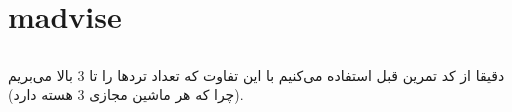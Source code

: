 \section{madvise}
\subsection{}
دقیقا از کد تمرین قبل استفاده می‌کنیم با این تفاوت که تعداد ترد‌ها را تا 3 بالا می‌بریم
(چرا که هر ماشین مجازی 3 هسته دارد).




